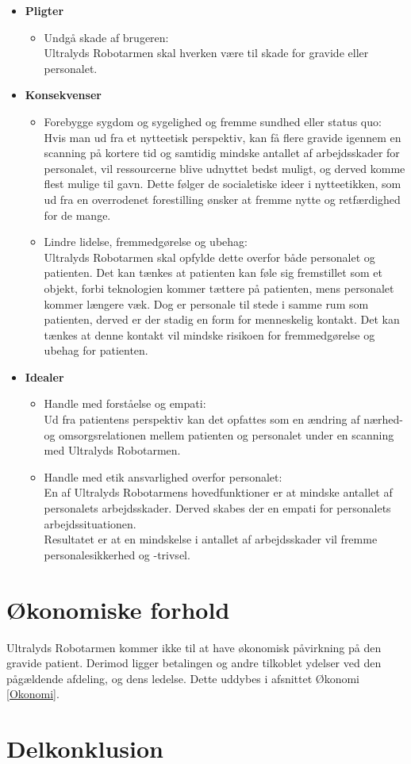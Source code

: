 \begin{itemize}
	\item \textbf{Pligter}
	\begin{itemize}
		\item Undgå skade af brugeren:\\ 
		Ultralyds Robotarmen skal hverken være til skade for gravide eller personalet. 
	\end{itemize} 
	\item \textbf{Konsekvenser}
	\begin{itemize}
		\item Forebygge sygdom og sygelighed og fremme sundhed eller status quo: \\
		Hvis man ud fra et nytteetisk perspektiv, kan få flere gravide igennem en scanning på kortere tid og samtidig mindske antallet af arbejdsskader for personalet, vil ressourcerne blive udnyttet bedst muligt, og derved komme flest mulige til gavn. Dette følger de socialetiske ideer i nytteetikken, som ud fra en overrodenet forestilling ønsker at fremme nytte og retfærdighed for de mange.    
		\item Lindre lidelse, fremmedgørelse og ubehag:\\
		Ultralyds Robotarmen skal opfylde dette overfor både personalet og patienten. Det kan tænkes at patienten kan føle sig fremstillet som et objekt, forbi teknologien kommer tættere på patienten, mens personalet kommer længere væk. Dog er personale til stede i samme rum som patienten, derved er der stadig en form for menneskelig kontakt. Det kan tænkes at denne kontakt vil mindske risikoen for fremmedgørelse og ubehag for patienten.   
	\end{itemize}
	\item \textbf{Idealer}
	\begin{itemize}
		\item Handle med forståelse og empati:\\
		Ud fra patientens perspektiv kan det opfattes som en ændring af nærhed- og omsorgsrelationen mellem patienten og personalet under en scanning med Ultralyds Robotarmen. 
		\item Handle med etik ansvarlighed overfor personalet:\\
		En af Ultralyds Robotarmens hovedfunktioner er at mindske antallet af personalets arbejdsskader. Derved skabes der en empati for personalets arbejdssituationen.\\
		Resultatet er at en mindskelse i antallet af arbejdsskader vil fremme personalesikkerhed og -trivsel.   		
	\end{itemize} 
\end{itemize} 

\section{Økonomiske forhold}
Ultralyds Robotarmen kommer ikke til at have økonomisk påvirkning på den gravide patient. Derimod ligger betalingen og andre tilkoblet ydelser ved den pågældende afdeling, og dens ledelse. Dette uddybes i afsnittet Økonomi \ref{Okonomi}. 
 
\section{Delkonklusion }